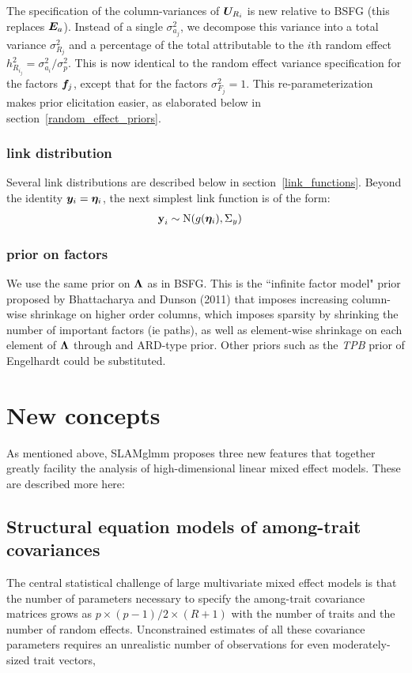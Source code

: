 \documentclass[11pt]{amsart}
\newcommand*{\B}[1]{\ifmmode\bm{#1}\else\textbf{#1}\fi}
\begin{document}
The specification of the column-variances of $\B{U}_{R_i}$ is new relative to BSFG (this replaces $\B{E}_a$). Instead of a single $\sigma^2_{a_j}$, we decompose this variance into a total variance $\sigma^2_{R_j}$ and a percentage of the total attributable to the $i$th random effect $h^2_{R_{i_j}} = \sigma^2_{a_i}/\sigma^2_p$. This is now identical to the random effect variance specification for the factors $\B{f}_j$, except that for the factors $\sigma^2_{F_j} = 1$. This re-parameterization makes prior elicitation easier, as elaborated below in section~\ref{random_effect_priors}.

\subsubsection{link distribution}
Several link distributions are described below in section~\ref{link_functions}. 
Beyond the identity $\B{y}_i = \B{\eta}_i$, the next simplest link function is of the form:
\begin{align}
\B{y}_i &\sim \mbox{N}(g(\B{\eta}_i),\Sigma_y)
\end{align}

\subsubsection{prior on factors}
We use the same prior on $\B{\Lambda}$ as in BSFG. This is the ``infinite factor model" prior proposed by Bhattacharya and Dunson (2011) that imposes increasing column-wise shrinkage on higher order columns, which imposes sparsity by shrinking the number of important factors (ie paths), as well as element-wise shrinkage on each element of $\B{\Lambda}$ through and ARD-type prior. Other priors such as the \emph{TPB} prior of Engelhardt could be substituted. 

\section{New concepts}
As mentioned above, SLAMglmm proposes three new features that together greatly facility the analysis of high-dimensional linear mixed effect models. These are described more here:

\subsection{Structural equation models of among-trait covariances}
The central statistical challenge of large multivariate mixed effect models is that the number of parameters necessary to specify the among-trait covariance matrices grows as $p\times(p-1)/2 \times (R+1)$ with the number of traits and the number of random effects. Unconstrained estimates of all these covariance parameters requires an unrealistic number of observations for even moderately-sized trait vectors,
\end{document}
